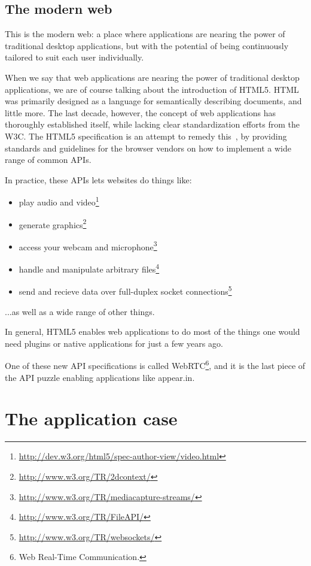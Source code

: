 \subsection{The modern web}
\label{intro:sub:the_modern_web}

This is the modern web: a place where applications are nearing the power of traditional desktop applications, but with the potential of being continuously tailored to suit each user individually.

When we say that web applications are nearing the power of traditional desktop applications, we are of course talking about the introduction of HTML5. HTML was primarily designed as a language for semantically describing documents, and little more. The last decade, however, the concept of web applications has thoroughly established itself, while lacking clear standardization efforts from the W3C. The HTML5 specification is an attempt to remedy this~\cite{W3CHTML5_intro}, by providing standards and guidelines for the browser vendors on how to implement a wide range of common APIs.

In practice, these APIs lets websites do things like:

\begin{itemize}
    \item play audio and video\footnote{\url{http://dev.w3.org/html5/spec-author-view/video.html}}
    \item generate graphics\footnote{\url{http://www.w3.org/TR/2dcontext/}}
    \item access your webcam and microphone\footnote{\url{http://www.w3.org/TR/mediacapture-streams/}}
    \item handle and manipulate arbitrary files\footnote{\url{http://www.w3.org/TR/FileAPI/}}
    \item send and recieve data over full-duplex socket connections\footnote{\url{http://www.w3.org/TR/websockets/}}
\end{itemize}

...as well as a wide range of other things.

In general, HTML5 enables web applications to do most of the things one would need plugins or native applications for just a few years ago.

One of these new API specifications is called WebRTC\footnote{Web Real-Time Communication.}, and it is the last piece of the API puzzle enabling applications like appear.in.

\section{The application case}
\label{intro:sec:appearin}

